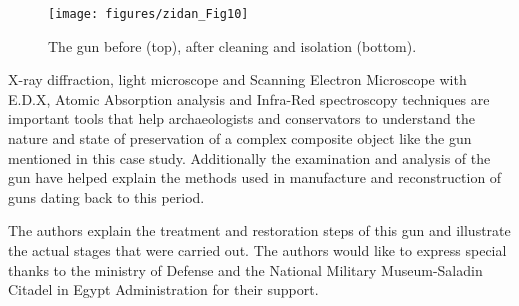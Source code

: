 \begin{figure}[!htb]
	\centering
	\texttt{[image: figures/zidan\_Fig10]}
	\caption{The gun before (top), after cleaning and isolation (bottom).}
	\label{fig:Fig10}
\end{figure}
\noindent X-ray diffraction, light microscope and Scanning Electron Microscope with E.D.X, Atomic Absorption analysis and Infra-Red spectroscopy techniques are important tools that help archaeologists and conservators to understand the nature and state of preservation of a complex composite object like the gun mentioned in this case study. Additionally the examination and analysis of the gun have helped explain the methods used in manufacture and reconstruction of guns dating back to this period. 

The authors explain the treatment and restoration steps of this gun and illustrate the actual stages that were carried out. 
\myseparator
The authors would like to express special thanks to the ministry of Defense and the National Military Museum-Saladin Citadel in Egypt Administration for their support. 


\printbibliography[heading=subbibnumbered] 
\label{zidan:lastpage}
\closingarticle
